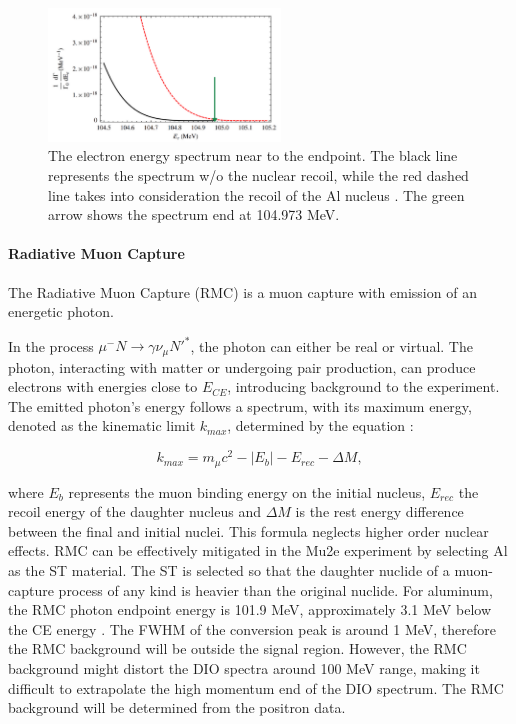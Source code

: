 \begin{figure}[!h]
\centering
\includegraphics[width =0.55\textwidth]{figures/png/Screenshot_20240909_141143.png}
\caption[The electron energy spectrum near to the endpoint.]{The electron energy spectrum near to the endpoint. The black line 
represents the  spectrum w/o the nuclear recoil, while the red 
dashed line takes into consideration the recoil of the Al nucleus 
\cite{PhysRevD.84.013006}. The green arrow shows the spectrum end at 104.973 MeV.
}
\label{fig:micheldiff}
\end{figure}


\paragraph{Radiative Muon Capture}
The Radiative Muon Capture (RMC) is a muon capture with emission of an energetic photon.

In the process $\mu^- N \rightarrow\gamma \nu_\mu N'^* $, 
the photon can either be real or virtual. The photon, interacting with matter or 
undergoing pair production, can produce electrons with energies close to $E_{CE}$, 
introducing background to the experiment. The emitted photon's energy follows 
a spectrum, with its maximum energy, denoted as the kinematic limit $k_{max}$, 
determined by the equation \cite{bartoszek2015mu2e}:

\begin{equation}
k_{max} = m_\mu c^2 - |E_b| - E_{rec} - \Delta M ,
\end{equation}

where $E_b$ represents the muon binding energy on the initial nucleus, $E_{rec}$  
the recoil energy of the daughter nucleus and $\Delta M$ is the rest energy difference 
between the final and initial nuclei. This formula neglects higher order nuclear effects. 
RMC can be effectively mitigated in the Mu2e experiment by 
selecting Al as the ST material. The ST is selected so that the daughter nuclide of a muon-capture 
process of any kind is heavier than the original nuclide. For aluminum, the RMC photon 
endpoint energy is 101.9 MeV, approximately 3.1 MeV below the CE energy 
\cite{bartoszek2015mu2e}. 
The FWHM of the conversion peak is around 1 MeV, therefore the RMC background will be 
outside the signal region. However, the RMC background might distort the DIO spectra 
around 100 MeV range, making it difficult to extrapolate the high momentum end of the DIO spectrum. 
The RMC background will be determined from the positron data.


